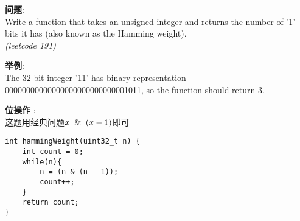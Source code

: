     
\begin{description}
    \item{\textbf{问题}}:\\
Write a function that takes an unsigned integer and returns the number of ’1' bits it has (also known as the Hamming weight).\\
\textit{(leetcode 191)}
    \item{\textbf{举例}}:\\
The 32-bit integer ’11' has binary representation 00000000000000000000000000001011, so the function should return 3.
    \item{\textbf{位操作}} : 
    \\这题用经典问题$x \And (x - 1)$即可
    \begin{lstlisting}
int hammingWeight(uint32_t n) {
	int count = 0;
	while(n){
		n = (n & (n - 1));
		count++;
	}
	return count;
}
    \end{lstlisting}
\end{description}
